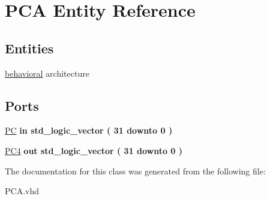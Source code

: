 \hypertarget{class_p_c_a}{\section{\-P\-C\-A \-Entity \-Reference}
\label{class_p_c_a}
}
\subsection*{\-Entities}
\begin{DoxyCompactItemize}
\item 
\hyperlink{class_p_c_a_1_1behavioral}{behavioral} architecture
\end{DoxyCompactItemize}
\*
\*
\subsection*{\-Ports}
 \begin{DoxyCompactItemize}
\item 
\hypertarget{class_p_c_a_acada270fc7a566335257788edda0be9e}{\hyperlink{class_p_c_a_acada270fc7a566335257788edda0be9e}{\-P\-C}  {\bfseries {\bfseries in }} {\bfseries std\-\_\-logic\-\_\-vector (   31    downto    0  ) } }\label{class_p_c_a_acada270fc7a566335257788edda0be9e}

\item 
\hypertarget{class_p_c_a_aa9f65dcf2c43f75406aff2f2f4f6d577}{\hyperlink{class_p_c_a_aa9f65dcf2c43f75406aff2f2f4f6d577}{\-P\-C4}  {\bfseries {\bfseries out }} {\bfseries std\-\_\-logic\-\_\-vector (   31    downto    0  ) } }\label{class_p_c_a_aa9f65dcf2c43f75406aff2f2f4f6d577}

\end{DoxyCompactItemize}


\-The documentation for this class was generated from the following file\-:\begin{DoxyCompactItemize}
\item 
\-P\-C\-A.\-vhd\end{DoxyCompactItemize}
